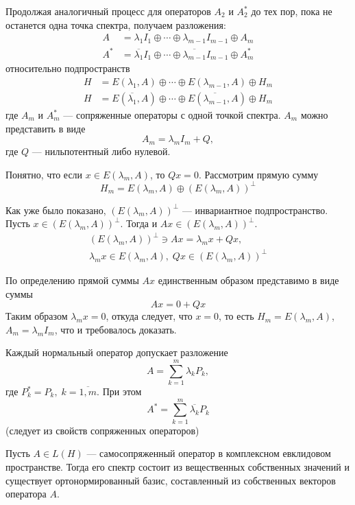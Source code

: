 \begin{proofbreak}
    Продолжая аналогичный процесс для операторов $A_2$ и $A_2^*$ до тех пор,
    пока не останется одна точка спектра, получаем разложения:
    \begin{align*}
        A &= \lambda_1 I_1 \oplus \dotsb \oplus \lambda_{m-1} I_{m-1} \oplus A_m
        \\
        A^* &= \overline{\lambda_1} I_1 \oplus \dotsb \oplus
        \overline{\lambda_{m-1}} I_{m-1} \oplus A_m^*
    \end{align*}
    относительно подпространств
    \begin{align*}
        H &= E(\lambda_1,A) \oplus \dotsb \oplus E(\lambda_{m-1}, A) \oplus H_m
        \\
        H &= E(\overline{\lambda_1},A) \oplus \dotsb \oplus
        E(\overline{\lambda_{m-1}}, A) \oplus H_m
    \end{align*}
    где $A_m$ и $A_m^*$ — сопряженные операторы с одной точкой спектра. $A_m$ можно представить в виде
    \[ A_m = \lambda_m I_m + Q, \]
    где $Q$ — нильпотентный либо нулевой. 
    
    Понятно, что если $x \in E(\lambda_m, A)$, то $Qx = 0$. Рассмотрим прямую
    сумму
    \[ H_m = E(\lambda_m, A) \oplus (E(\lambda_m,A))^\perp \]

    Как уже было показано, $(E(\lambda_m, A))^\perp$ — инвариантное
    подпространство. Пусть $x \in (E(\lambda_m, A))^\perp$. Тогда и $Ax \in
    (E(\lambda_m, A))^\perp$.
    \begin{gather*}
        (E(\lambda_m, A))^\perp \ni Ax = \lambda_m x + Qx,\\
        \lambda_m x \in E(\lambda_m, A), \; Qx \in (E(\lambda_m,A))^\perp
    \end{gather*}

    По определению прямой суммы $Ax$ единственным образом представимо в виде
    суммы
    \[ Ax = 0 + Qx \]
    Таким образом $\lambda_m x = 0$, откуда следует, что $x = 0$, то есть
    $H_m = E(\lambda_m, A)$, $A_m = \lambda_m I_m$, что и требовалось доказать.
\end{proofbreak}

\begin{corollaryth}
    Каждый нормальный оператор допускает разложение
    \[ A = \sum_{k=1}^m \lambda_k P_k, \]
    где $P_k^* = P_k, \; k = \overline{1,m}$. При этом
    \[ A^* = \sum_{k=1}^m \overline{\lambda_k} P_k \]
    (следует из свойств сопряженных операторов)
\end{corollaryth}

\begin{theorem}\label{th:selfadjointspectrum}
    Пусть $A \in L(H)$ --- самосопряженный оператор в комплексном евклидовом
    пространстве. Тогда его спектр состоит из вещественных собственных значений
    и существует ортонормированный базис, составленный из собственных векторов
    оператора $A$.
\end{theorem}

